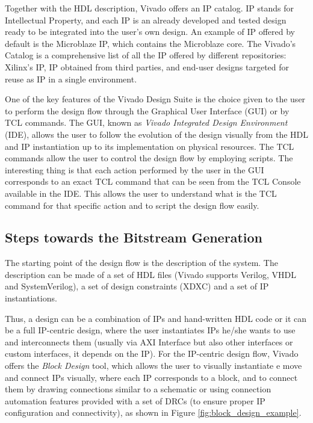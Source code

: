 Together with the HDL description, Vivado offers an IP catalog. IP stands for Intellectual Property, and each IP is an already developed and tested design ready to be integrated into the user's own design. An example of IP offered by default is the Microblaze IP, which contains the Microblaze core. The Vivado's Catalog is a comprehensive list of all the IP offered by different repositories: Xilinx's IP, IP obtained from third parties, and end-user designs targeted for reuse as IP in a single environment. \bigskip

One of the key features of the Vivado Design Suite is the choice given to the user to perform the design flow through the Graphical User Interface (GUI) or by TCL commands. The GUI, known as \textit{Vivado Integrated Design Environment} (IDE), allows the user to follow the evolution of the design visually from the HDL and IP instantiation up to its implementation on physical resources. The TCL commands allow the user to control the design flow by employing scripts. The interesting thing is that each action performed by the user in the GUI corresponds to an exact TCL command that can be seen from the TCL Console available in the IDE. This allows the user to understand what is the TCL command for that specific action and to script the design flow easily. 

\subsection{Steps towards the Bitstream Generation}
\label{sec:bitstreamgen}

The starting point of the design flow is the description of the system. The description can be made of a set of HDL files (Vivado supports Verilog, VHDL and SystemVerilog), a set of design constraints (XDXC) and a set of IP instantiations. \bigskip 

Thus, a design can be a combination of IPs and hand-written HDL code or it can be a full IP-centric design, where the user instantiates IPs he/she wants to use and interconnects them (usually via AXI Interface but also other interfaces or custom interfaces, it depends on the IP). For the IP-centric design flow, Vivado offers the \textit{Block Design} tool, which allows the user to visually instantiate e move and connect IPs visually, where each IP corresponds to a block, and to connect them by drawing connections similar to a schematic or using connection automation features provided with a set of DRCs (to ensure proper IP configuration and connectivity), as shown in Figure \ref{fig:block_design_example}. \bigskip

